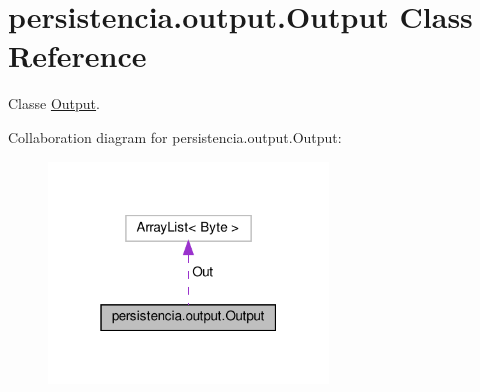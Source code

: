 \hypertarget{classpersistencia_1_1output_1_1Output}{}\section{persistencia.\+output.\+Output Class Reference}
\label{classpersistencia_1_1output_1_1Output}


Classe \hyperlink{classpersistencia_1_1output_1_1Output}{Output}.  




Collaboration diagram for persistencia.\+output.\+Output\+:\nopagebreak
\begin{figure}[H]
\begin{center}
\leavevmode
\includegraphics[width=211pt]{classpersistencia_1_1output_1_1Output__coll__graph}
\end{center}
\end{figure}
